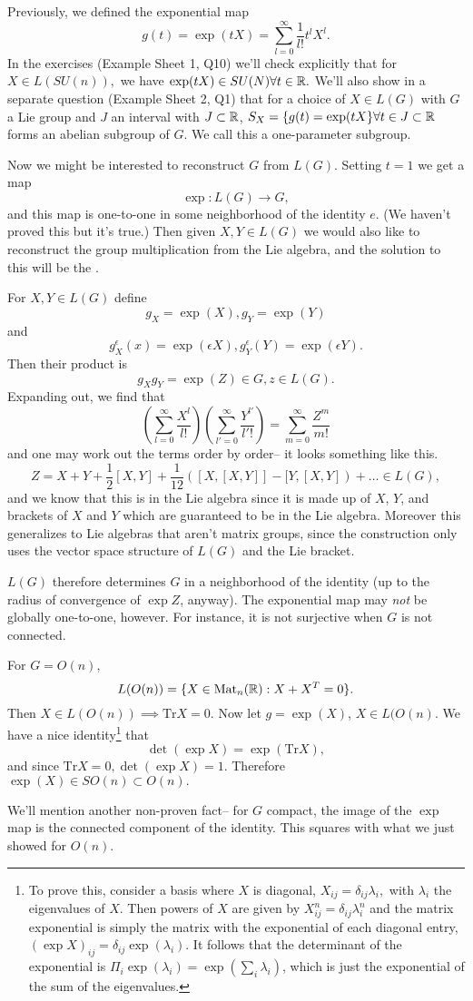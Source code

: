 Previously, we defined the exponential map
$$g(t)=\exp(tX)=\sum_{l=0}^\infty \frac{1}{l!}t^l X^l.$$ In the exercises (Example Sheet 1, Q10) we'll check explicitly that for $X\in L(SU(n)),$ we have $\exp(tX)\in SU(N) \forall t\in \mathbb{R}.$ We'll also show in a separate question (Example Sheet 2, Q1) that for a choice of $X\in L(G)$ with $G$ a Lie group and $J$ an interval with $J\subset \mathbb{R}$, $S_X=\{g(t)=\exp(tX\} \forall t \in J \subset \mathbb{R}$ forms an abelian subgroup of $G$. We call this a one-parameter subgroup.

Now we might be interested to reconstruct $G$ from $L(G)$. Setting $t=1$ we get a map $$\exp:L(G)\to G,$$ and this map is one-to-one in some neighborhood of the identity $e$. (We haven't proved this but it's true.) Then given $X,Y\in L(G)$ we would also like to reconstruct the group multiplication from the Lie algebra, and the solution to this will be the .

For $X,Y\in L(G)$ define
$$g_X=\exp(X), g_Y=\exp(Y)$$
and
$$g_X^\epsilon(x)=\exp(\epsilon X), g_Y^\epsilon(Y)=\exp (\epsilon Y).$$
Then their product is
$$g_X g_Y= \exp(Z)\in G, z\in L(G).$$ Expanding out, we find that
$$\left(\sum_{l=0}^\infty \frac{X^l}{l!}\right)\left(\sum_{l'=0}^\infty \frac{Y^{l'}}{l' !}\right)=\sum_{m=0}^\infty \frac{Z^m}{m!}$$
and one may work out the terms order by order-- it looks something like this.
$$Z=X+Y+\frac{1}{2}[X,Y]+\frac{1}{12}([X,[X,Y]]-[Y,[X,Y])+\ldots \in L(G),$$
and we know that this is in the Lie algebra since it is made up of $X$, $Y$, and brackets of $X$ and $Y$ which are guaranteed to be in the Lie algebra. Moreover this generalizes to Lie algebras that aren't matrix groups, since the construction only uses the vector space structure of $L(G)$ and the Lie bracket.

$L(G)$ therefore determines $G$ in a neighborhood of the identity (up to the radius of convergence of $\exp Z$, anyway). The exponential map may \emph{not} be globally one-to-one, however. For instance, it is not surjective when $G$ is not connected.
\begin{exm}
For $G=O(n)$, 
$$L(O(n))=\{X\in \text{Mat}_n(\mathbb{R}): X+X^T=0\}.$$ 
Then $X\in L(O(n)) \implies \text{Tr} X=0.$ Now let $g=\exp(X)$, $X\in L(O(n)$. We have a nice identity\footnote{To prove this, consider a basis where $X$ is diagonal, $X_{ij}=\delta_{ij}\lambda_i,$ with $\lambda_i$ the eigenvalues of $X$. Then powers of $X$ are given by $X_{ij}^n=\delta_{ij}\lambda_i^n$ and the matrix exponential is simply the matrix with the exponential of each diagonal entry, $(\exp X)_{ij}=\delta_{ij} \exp(\lambda_i).$ It follows that the determinant of the exponential is $\Pi_i \exp(\lambda_i)= \exp(\sum_i \lambda_i)$, which is just the exponential of the sum of the eigenvalues.} that
$$\det (\exp X) = \exp(\text{Tr} X),$$
and since $\text{Tr} X = 0, \det (\exp X) = 1$. Therefore $\exp(X)\in SO(n) \subset O(n).$

We'll mention another non-proven fact-- for $G$ compact, the image of the $\exp$ map is the connected component of the identity. This squares with what we just showed for $O(n).$
\end{exm}

